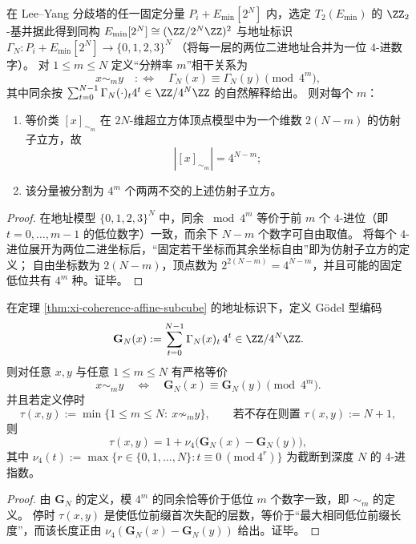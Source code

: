 \begin{theorem}[相干等价类的仿射子立方结构]\label{thm:xi-coherence-affine-subcube}
在 Lee--Yang 分歧塔的任一固定分量 \(P_i+E_{\min}[2^N]\) 内，选定 \(T_2(E_{\min})\) 的 \(\ZZ_2\)-基并据此得到同构
\(
E_{\min}[2^N]\cong(\ZZ/2^N\ZZ)^2
\)
与地址标识
\(
\Gamma_N:P_i+E_{\min}[2^N]\to\{0,1,2,3\}^N
\)
（将每一层的两位二进地址合并为一位 \(4\)-进数字）。
对 \(1\le m\le N\) 定义“分辨率 \(m\)”相干关系为
\[
x\sim_m y
\quad:\!\!\Longleftrightarrow\quad
\Gamma_N(x)\equiv \Gamma_N(y)\pmod{4^m},
\]
其中同余按 \(\sum_{t=0}^{N-1}\Gamma_N(\cdot)_t4^t\in\ZZ/4^N\ZZ\) 的自然解释给出。
则对每个 \(m\)：
\begin{enumerate}
  \item 等价类 \([x]_{\sim_m}\) 在 \(2N\)-维超立方体顶点模型中为一个维数 \(2(N-m)\) 的仿射子立方，故
  \[
  |[x]_{\sim_m}|=4^{N-m};
  \]
  \item 该分量被分割为 \(4^m\) 个两两不交的上述仿射子立方。
\end{enumerate}
\end{theorem}
\begin{proof}
在地址模型 \(\{0,1,2,3\}^N\) 中，同余 \(\bmod 4^m\) 等价于前 \(m\) 个 \(4\)-进位（即 \(t=0,\dots,m-1\) 的低位数字）一致，而余下 \(N-m\) 个数字可自由取值。
将每个 \(4\)-进位展开为两位二进坐标后，“固定若干坐标而其余坐标自由”即为仿射子立方的定义；
自由坐标数为 \(2(N-m)\)，顶点数为 \(2^{2(N-m)}=4^{N-m}\)，并且可能的固定低位共有 \(4^m\) 种。证毕。
\end{proof}

\begin{theorem}\label{thm:xi-coherence-godel-4adic-valuation}
在定理 \ref{thm:xi-coherence-affine-subcube} 的地址标识下，定义 Gödel 型编码
\[
\mathbf G_N(x):=\sum_{t=0}^{N-1}\Gamma_N(x)_t\,4^t\in \ZZ/4^N\ZZ.
\]
则对任意 \(x,y\) 与任意 \(1\le m\le N\) 有严格等价
\[
x\sim_m y
\quad\Longleftrightarrow\quad
\mathbf G_N(x)\equiv \mathbf G_N(y)\pmod{4^m}.
\]
并且若定义停时
\[
\tau(x,y):=\min\{1\le m\le N:\ x\not\sim_m y\},\qquad
\text{若不存在则置 }\tau(x,y):=N+1,
\]
则
\[
\tau(x,y)=1+\nu_4\!\bigl(\mathbf G_N(x)-\mathbf G_N(y)\bigr),
\]
其中 \(\nu_4(t):=\max\{r\in\{0,1,\dots,N\}: t\equiv 0\ (\mathrm{mod}\ 4^r)\}\) 为截断到深度 \(N\) 的 \(4\)-进指数。
\end{theorem}
\begin{proof}
由 \(\mathbf G_N\) 的定义，模 \(4^m\) 的同余恰等价于低位 \(m\) 个数字一致，即 \(\sim_m\) 的定义。
停时 \(\tau(x,y)\) 是使低位前缀首次失配的层数，等价于“最大相同低位前缀长度”，而该长度正由 \(\nu_4(\mathbf G_N(x)-\mathbf G_N(y))\) 给出。证毕。
\end{proof}

\endinput

